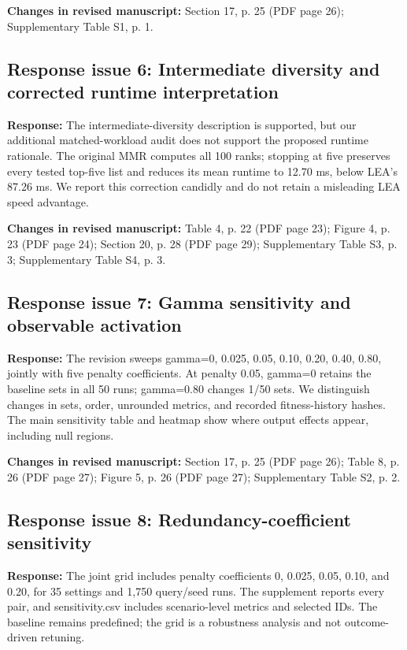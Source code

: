 \documentclass[11pt,a4paper]{article}
\begin{document}
\textbf{Changes in revised manuscript:} Section 17, p. 25 (PDF page 26); Supplementary Table S1, p. 1.

\subsection*{Response issue 6: Intermediate diversity and corrected runtime interpretation}
\textbf{Response:} The intermediate-diversity description is supported, but our additional matched-workload audit does not support the proposed runtime rationale. The original MMR computes all 100 ranks; stopping at five preserves every tested top-five list and reduces its mean runtime to 12.70 ms, below LEA's 87.26 ms. We report this correction candidly and do not retain a misleading LEA speed advantage.

\textbf{Changes in revised manuscript:} Table 4, p. 22 (PDF page 23); Figure 4, p. 23 (PDF page 24); Section 20, p. 28 (PDF page 29); Supplementary Table S3, p. 3; Supplementary Table S4, p. 3.

\subsection*{Response issue 7: Gamma sensitivity and observable activation}
\textbf{Response:} The revision sweeps gamma=0, 0.025, 0.05, 0.10, 0.20, 0.40, 0.80, jointly with five penalty coefficients. At penalty 0.05, gamma=0 retains the baseline sets in all 50 runs; gamma=0.80 changes 1/50 sets. We distinguish changes in sets, order, unrounded metrics, and recorded fitness-history hashes. The main sensitivity table and heatmap show where output effects appear, including null regions.

\textbf{Changes in revised manuscript:} Section 17, p. 25 (PDF page 26); Table 8, p. 26 (PDF page 27); Figure 5, p. 26 (PDF page 27); Supplementary Table S2, p. 2.

\subsection*{Response issue 8: Redundancy-coefficient sensitivity}
\textbf{Response:} The joint grid includes penalty coefficients 0, 0.025, 0.05, 0.10, and 0.20, for 35 settings and 1,750 query/seed runs. The supplement reports every pair, and sensitivity.csv includes scenario-level metrics and selected IDs. The baseline remains predefined; the grid is a robustness analysis and not outcome-driven retuning.
\end{document}
